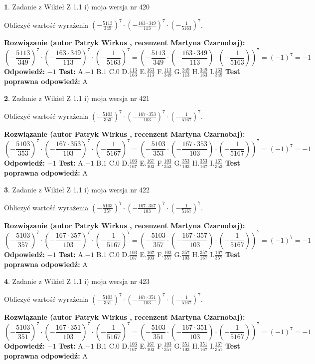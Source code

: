 \documentclass[12pt, a4paper]{article}
\theoremstyle{definition} %
\newtheorem{zad}{}
\newcommand{\zadStart}[1]{\begin{zad}#1\newline}
\newcommand{\zadStop}{\end{zad}}
\newcommand{\rozwStart}[2]{\noindent \textbf{Rozwiązanie (autor #1 , recenzent #2): }\newline}
\newcommand{\rozwStop}{\newline}
\newcommand{\odpStart}{\noindent \textbf{Odpowiedź:}\newline}
\newcommand{\odpStop}{\newline}
\newcommand{\testStart}{\noindent \textbf{Test:}\newline}
\newcommand{\testStop}{\newline}
\newcommand{\kluczStart}{\noindent \textbf{Test poprawna odpowiedź:}\newline}
\newcommand{\kluczStop}{\newline}
\begin{document}
\zadStart{Zadanie z Wikieł Z 1.1 i) moja wersja nr 420}

Obliczyć wartość wyrażenia $(-\frac{5113}{349})^{7} \cdot (-\frac{163 \cdot 349}{113})^{7} \cdot (-\frac{1}{5163})^{7}$.
\zadStop
\rozwStart{Patryk Wirkus}{Martyna Czarnobaj}
$$(-\frac{5113}{349})^{7} \cdot (-\frac{163 \cdot 349}{113})^{7} \cdot (-\frac{1}{5163})^{7} = (-\frac{5113}{349} \cdot (-\frac{163 \cdot 349}{113}) \cdot (-\frac{1}{5163}))^{7} = (-1)^{7} = -1$$
\rozwStop
\odpStart
$-1$
\odpStop
\testStart
A.$-1$ B.$1$ C.$0$ D.$\frac{113}{163}$ E.$\frac{163}{113}$
F.$\frac{113}{349}$ G.$\frac{349}{113}$
H.$\frac{349}{163}$
I.$\frac{163}{349}$
\testStop
\kluczStart
A
\kluczStop



\zadStart{Zadanie z Wikieł Z 1.1 i) moja wersja nr 421}

Obliczyć wartość wyrażenia $(-\frac{5103}{353})^{7} \cdot (-\frac{167 \cdot 353}{103})^{7} \cdot (-\frac{1}{5167})^{7}$.
\zadStop
\rozwStart{Patryk Wirkus}{Martyna Czarnobaj}
$$(-\frac{5103}{353})^{7} \cdot (-\frac{167 \cdot 353}{103})^{7} \cdot (-\frac{1}{5167})^{7} = (-\frac{5103}{353} \cdot (-\frac{167 \cdot 353}{103}) \cdot (-\frac{1}{5167}))^{7} = (-1)^{7} = -1$$
\rozwStop
\odpStart
$-1$
\odpStop
\testStart
A.$-1$ B.$1$ C.$0$ D.$\frac{103}{167}$ E.$\frac{167}{103}$
F.$\frac{103}{353}$ G.$\frac{353}{103}$
H.$\frac{353}{167}$
I.$\frac{167}{353}$
\testStop
\kluczStart
A
\kluczStop



\zadStart{Zadanie z Wikieł Z 1.1 i) moja wersja nr 422}

Obliczyć wartość wyrażenia $(-\frac{5103}{357})^{7} \cdot (-\frac{167 \cdot 357}{103})^{7} \cdot (-\frac{1}{5167})^{7}$.
\zadStop
\rozwStart{Patryk Wirkus}{Martyna Czarnobaj}
$$(-\frac{5103}{357})^{7} \cdot (-\frac{167 \cdot 357}{103})^{7} \cdot (-\frac{1}{5167})^{7} = (-\frac{5103}{357} \cdot (-\frac{167 \cdot 357}{103}) \cdot (-\frac{1}{5167}))^{7} = (-1)^{7} = -1$$
\rozwStop
\odpStart
$-1$
\odpStop
\testStart
A.$-1$ B.$1$ C.$0$ D.$\frac{103}{167}$ E.$\frac{167}{103}$
F.$\frac{103}{357}$ G.$\frac{357}{103}$
H.$\frac{357}{167}$
I.$\frac{167}{357}$
\testStop
\kluczStart
A
\kluczStop



\zadStart{Zadanie z Wikieł Z 1.1 i) moja wersja nr 423}

Obliczyć wartość wyrażenia $(-\frac{5103}{351})^{7} \cdot (-\frac{167 \cdot 351}{103})^{7} \cdot (-\frac{1}{5167})^{7}$.
\zadStop
\rozwStart{Patryk Wirkus}{Martyna Czarnobaj}
$$(-\frac{5103}{351})^{7} \cdot (-\frac{167 \cdot 351}{103})^{7} \cdot (-\frac{1}{5167})^{7} = (-\frac{5103}{351} \cdot (-\frac{167 \cdot 351}{103}) \cdot (-\frac{1}{5167}))^{7} = (-1)^{7} = -1$$
\rozwStop
\odpStart
$-1$
\odpStop
\testStart
A.$-1$ B.$1$ C.$0$ D.$\frac{103}{167}$ E.$\frac{167}{103}$
F.$\frac{103}{351}$ G.$\frac{351}{103}$
H.$\frac{351}{167}$
I.$\frac{167}{351}$
\testStop
\kluczStart
A
\kluczStop
\end{document}
